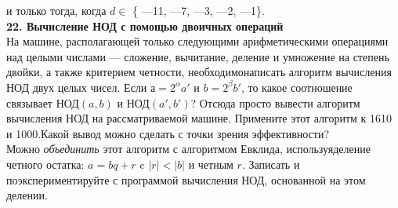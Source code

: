 \documentclass{mai_book}
\begin{document}
и только тогда, когда $d \in$  \{ —11, —7, —3, —2, —1\}. 
\\
 \newline
\noindent\textbf{22. Вычисление НОД с помощью двоичных операций}\\
 \newline
\hspace*{10pt} На машине, располагающей только следующими арифметическими\linebreak
операциями над целыми числами — сложение, вычитание, деление и\linebreak
умножение на степень двойки, а также критерием четности, необходимо\linebreak написать алгоритм вычисления НОД двух целых чисел.
 \newline
\hspace*{10pt} Если $а = 2^\alpha a'$ и $b = 2^\beta b'$, то какое соотношение связывает НОД$(a, b)$\linebreak
и НОД$(a', b')$? Отсюда просто вывести алгоритм вычисления НОД на\linebreak
рассматриваемой машине. Примените этот алгоритм к 1610 и 1000.\linebreak Какой вывод можно сделать с точки зрения эффективности?\\
\hspace*{10pt} Можно \textit{объединить} этот алгоритм с алгоритмом Евклида, используя\linebreak деление четного остатка: $a = bq + r$ c $|r| < |b|$ и четным $r$. Записать\linebreak
и поэкспериментируйте с программой вычисления НОД, основанной на\linebreak
этом делении.\pagebreak

\end{document}
